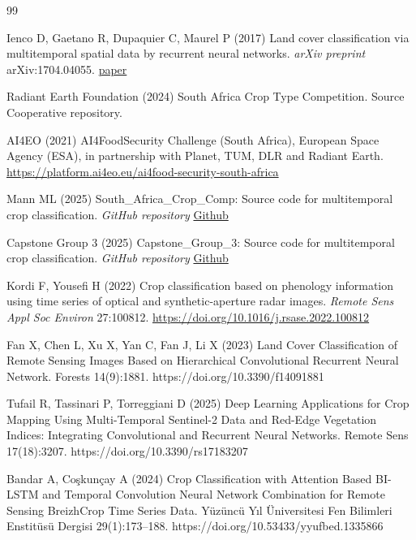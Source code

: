 \documentclass[pdflatex,sn-mathphys]{sn-jnl} %
\begin{document}
\clearpage

\begin{thebibliography}{99}


Ienco D, Gaetano R, Dupaquier C, Maurel P (2017) Land cover classification via 
multitemporal spatial data by recurrent neural networks. \textit{arXiv preprint} 
arXiv:1704.04055. \href{https://arxiv.org/abs/1704.04055}{paper}

Radiant Earth Foundation (2024) South Africa Crop Type Competition. Source Cooperative repository.

AI4EO (2021) AI4FoodSecurity Challenge (South Africa), European Space Agency (ESA), in partnership with Planet, TUM, DLR and Radiant Earth. \href{https://platform.ai4eo.eu/ai4food-security-south-africa}{https://platform.ai4eo.eu/ai4food-security-south-africa}

Mann ML (2025) South\_Africa\_Crop\_Comp: Source code for multitemporal crop classification. \textit{GitHub repository}
\href{https://github.com/mmann1123/South_Africa_Crop_Comp}{Github}

Capstone Group 3 (2025) Capstone\_Group\_3: Source code for multitemporal crop classification. \textit{GitHub repository}
\href{https://github.com/DishaKacha7/Capstone_Group_3}{Github}

Kordi F, Yousefi H (2022) Crop classification based on phenology information using time series of optical and synthetic-aperture radar images. \textit{Remote Sens Appl Soc Environ} 27:100812. \href{https://doi.org/10.1016/j.rsase.2022.100812}{https://doi.org/10.1016/j.rsase.2022.100812}


Fan X, Chen L, Xu X, Yan C, Fan J, Li X (2023) Land Cover Classification of Remote Sensing Images Based on Hierarchical Convolutional Recurrent Neural Network. Forests 14(9):1881. https://doi.org/10.3390/f14091881

Tufail R, Tassinari P, Torreggiani D (2025) Deep Learning Applications for Crop Mapping Using Multi-Temporal Sentinel-2 Data and Red-Edge Vegetation Indices: Integrating Convolutional and Recurrent Neural Networks. Remote Sens 17(18):3207. https://doi.org/10.3390/rs17183207

Bandar A, Co\c{s}kun\c{c}ay A (2024) Crop Classification with Attention Based BI-LSTM and Temporal Convolution Neural Network Combination for Remote Sensing BreizhCrop Time Series Data. Y\"uz\"unc\"u Y{\i}l \"Universitesi Fen Bilimleri Enstit\"us\"u Dergisi 29(1):173--188. https://doi.org/10.53433/yyufbed.1335866


\end{thebibliography}
\end{document}
